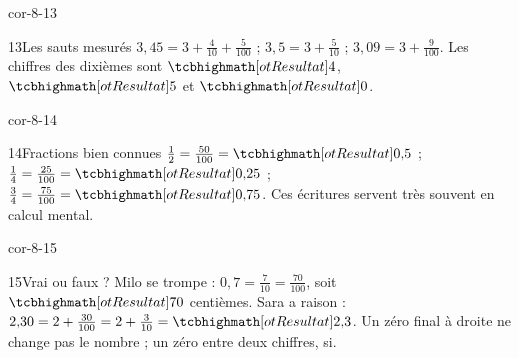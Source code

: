 \begin{blocLivre}{cor-8-13}\begin{corrige}{13}{Les sauts mesurés}
$3{,}45=3+\frac4{10}+\frac5{100}$ ; $3{,}5=3+\frac5{10}$ ; $3{,}09=3+\frac9{100}$. Les chiffres des dixièmes sont $\res4$, $\res5$ et $\res0$.
\end{corrige}\end{blocLivre}
\begin{blocLivre}{cor-8-14}\begin{corrige}{14}{Fractions bien connues}
$\frac12=\frac{50}{100}=\res{0{,}5}$ ; $\frac14=\frac{25}{100}=\res{0{,}25}$ ; $\frac34=\frac{75}{100}=\res{0{,}75}$. Ces écritures servent très souvent en calcul mental.
\end{corrige}\end{blocLivre}
\begin{blocLivre}{cor-8-15}\begin{corrige}{15}{Vrai ou faux ?}
Milo se trompe : $0{,}7=\frac7{10}=\frac{70}{100}$, soit $\res{70}$ centièmes. Sara a raison : $2{,}30=2+\frac{30}{100}=2+\frac3{10}=\res{2{,}3}$. Un zéro final à droite ne change pas le nombre ; un zéro entre deux chiffres, si.
\end{corrige}\end{blocLivre}
